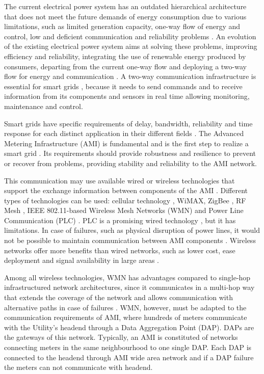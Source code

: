 \documentclass[conference]{IEEEtran}
\begin{document}
The current electrical power system has an outdated hierarchical architecture that does not meet the future demands of energy consumption due to various limitations, such as limited generation capacity, one-way flow of energy and control, low and deficient communication and reliability problems \cite{Farhangi2010}. 
An evolution of the existing electrical power system aims at solving these problems, improving efficiency and reliability, integrating the use of renewable energy produced by consumers, departing from the current one-way flow and deploying a two-way flow for energy and communication \cite {Farhangi2010,Moslehi2010}. A two-way communication infrastructure is essential for smart grids \cite{Gungor2011}, because it needs to send commands and to receive information from its components and sensors in real time allowing monitoring, maintenance and control.

Smart grids have specific requirements of delay, bandwidth, reliability and time response for each distinct application in their different fields \cite{Gungor2011}. The Advanced Metering Infrastructure (AMI) is fundamental and is the first step to realize a smart grid \cite{4781067,5484223}. Its requirements should provide robustness and resilience to prevent or recover from problems, providing stability and reliability to the AMI network. 

This communication may use available wired or wireless technologies that support the exchange information between components of the AMI \cite{Saputro2012,4547164}. Different types of technologies can be used: cellular technology \cite{5589988}, WiMAX, ZigBee \cite{5589988}, RF Mesh \cite{5622071}, IEEE 802.11-based Wireless Mesh Networks (WMN) and Power Line Communication (PLC) \cite{5479945}. PLC is a promising wired technology \cite{Saputro2012}, but it has limitations. In case of failures, such as physical disruption of power lines, it would not be possible to maintain communication between AMI components \cite{Gungor2006}. Wireless networks offer more benefits than wired networks, such as lower cost, ease deployment and signal availability in large areas \cite{5589988}. 

Among all wireless technologies, WMN has advantages compared to single-hop infrastructured network architectures, since it communicates in a multi-hop way that extends the coverage of the network and allows communication with alternative paths in case of failures \cite{5622071,Fang2012}. WMN, however, must be adapted to the communication requirements of AMI, where hundreds of meters communicate with the Utility's headend through a Data Aggregation Point (DAP). DAPs are the gateways of this network. Typically, an AMI is constituted of networks connecting meters in the same neighbourhood to one single DAP. Each DAP is connected to the headend through AMI wide area network and if a DAP failure the meters can not communicate with headend.
\end{document}
